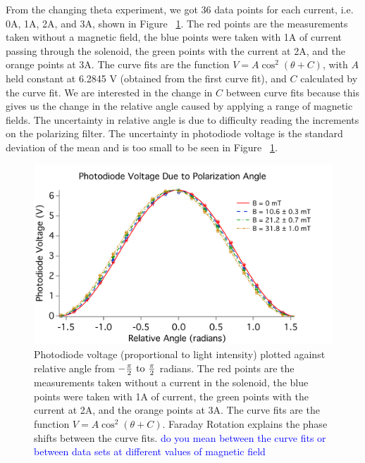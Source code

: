 \documentclass[prb,preprint]{revtex4-1}
\begin{document}
From the changing theta experiment, we got 36 data points for each current, i.e. 0A, 1A, 2A, and 3A, shown in Figure ~\ref{V_ThetaRel_Plot}. The red points are the measurements taken without a magnetic field, the blue points were taken with 1A of current passing through the solenoid, the green points with the current at 2A, and the orange points at 3A.  The curve fits are the function $V = A \cos^{2}(\theta + C)$, with $A$ held constant at 6.2845 V (obtained from the first curve fit), and $C$ calculated by the curve fit. We are interested in the change in $C$ between curve fits because this gives us the change in the relative angle caused by applying a range of magnetic fields. The uncertainty in relative angle is due to difficulty reading the increments on the polarizing filter. The uncertainty in photodiode voltage is the standard deviation of the mean and is too small to be seen in Figure ~\ref{V_ThetaRel_Plot}.

\begin{figure}[h!]
\centering

\includegraphics[width=6in]{V_ThetaRel_Plot.pdf}
\caption{Photodiode voltage (proportional to light intensity) plotted against relative angle from $-\frac{\pi}{2} \rm{\ to\ } \frac{\pi}{2}$ radians.  The red points are the measurements taken without a current in the solenoid, the blue points were taken with 1A of current, the green points with the current at 2A, and the orange points at 3A.  The curve fits are the function $V = A \cos^{2}(\theta + C) $. Faraday Rotation explains the phase shifts between the curve fits. \textcolor{blue}{do you mean between the curve fits or between data sets at different values of magnetic field}}

\label{V_ThetaRel_Plot}
\end{figure}
\end{document}
